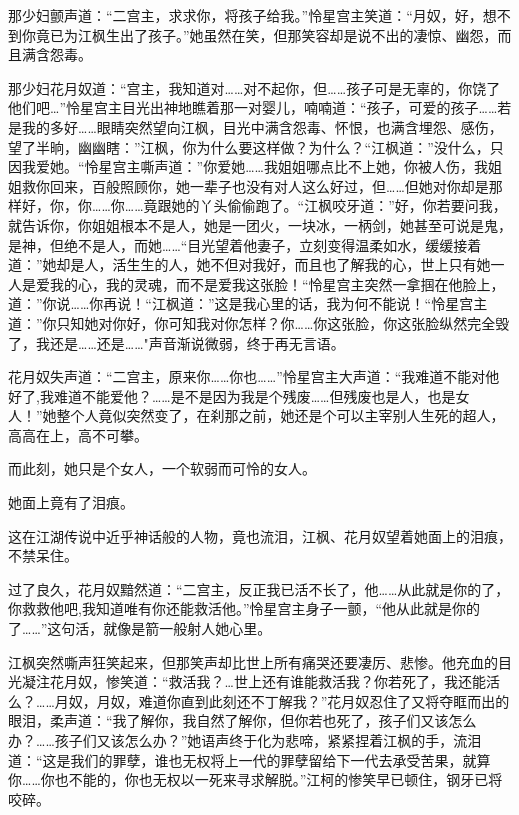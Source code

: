 \documentclass[12pt,oneside]{book}
\begin{document}
那少妇颤声道：``二宫主，求求你，将孩子给我。''怜星宫主笑道：``月奴，好，想不到你竟已为江枫生出了孩子。''她虽然在笑，但那笑容却是说不出的凄惊、幽怨，而且满含怨毒。

那少妇花月奴道：``宫主，我知道对\ldots\ldots 对不起你，但\ldots\ldots 孩子可是无辜的，你饶了他们吧\ldots{}''怜星宫主目光出神地瞧着那一对婴儿，喃喃道：``孩子，可爱的孩子\ldots\ldots 若是我的多好\ldots\ldots 眼睛突然望向江枫，目光中满含怨毒、怀恨，也满含埋怨、感伤，望了半晌，幽幽瞎：''江枫，你为什么要这样做？为什么？``江枫道：''没什么，只因我爱她。``怜星宫主嘶声道：''你爱她\ldots\ldots 我姐姐哪点比不上她，你被人伤，我姐姐救你回来，百般照顾你，她一辈子也没有对人这么好过，但\ldots\ldots 但她对你却是那样好，你，你\ldots\ldots 你\ldots\ldots 竟跟她的丫头偷偷跑了。``江枫咬牙道：''好，你若要问我，就告诉你，你姐姐根本不是人，她是一团火，一块冰，一柄剑，她甚至可说是鬼，是神，但绝不是人，而她\ldots\ldots{}``目光望着他妻子，立刻变得温柔如水，缓缓接着道：''她却是人，活生生的人，她不但对我好，而且也了解我的心，世上只有她一人是爱我的心，我的灵魂，而不是爱我这张脸！``怜星宫主突然一拿掴在他脸上，道：''你说\ldots\ldots 你再说！``江枫道：''这是我心里的话，我为何不能说！``怜星宫主道：''你只知她对你好，你可知我对你怎样？你\ldots\ldots 你这张脸，你这张脸纵然完全毁了，我还是\ldots\ldots 还是\ldots\ldots"声音渐说微弱，终于再无言语。

花月奴失声道：``二宫主，原来你\ldots\ldots 你也\ldots\ldots{}''怜星宫主大声道：``我难道不能对他好了,我难道不能爱他？\ldots\ldots 是不是因为我是个残废\ldots\ldots 但残废也是人，也是女人！''她整个人竟似突然变了，在刹那之前，她还是个可以主宰别人生死的超人，高高在上，高不可攀。

而此刻，她只是个女人，一个软弱而可怜的女人。

她面上竟有了泪痕。

这在江湖传说中近乎神话般的人物，竟也流泪，江枫、花月奴望着她面上的泪痕，不禁呆住。

过了良久，花月奴黯然道：``二宫主，反正我已活不长了，他\ldots\ldots 从此就是你的了，你救救他吧,我知道唯有你还能救活他。''怜星宫主身子一颤，``他从此就是你的了\ldots\ldots{}''这句活，就像是箭一般射人她心里。

江枫突然嘶声狂笑起来，但那笑声却比世上所有痛哭还要凄厉、悲惨。他充血的目光凝注花月奴，惨笑道：``救活我？\ldots 世上还有谁能救活我？你若死了，我还能活么？\ldots\ldots 月奴，月奴，难道你直到此刻还不丁解我？''花月奴忍住了又将夺眶而出的眼泪，柔声道：``我了解你，我自然了解你，但你若也死了，孩子们又该怎么办？\ldots\ldots 孩子们又该怎么办？''她语声终于化为悲啼，紧紧捏着江枫的手，流泪道：``这是我们的罪孽，谁也无权将上一代的罪孽留给下一代去承受苦果，就算你\ldots\ldots 你也不能的，你也无权以一死来寻求解脱。''江柯的惨笑早已顿住，钢牙已将咬碎。
\end{document}
